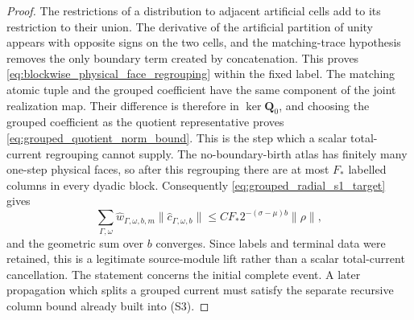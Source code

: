 \documentclass[11pt]{amsart}
\theoremstyle{compactplain}
\theoremstyle{compactdefinition}
\theoremstyle{compactremark}
\begin{document}
\begin{proof}
The restrictions of a distribution to adjacent artificial cells add to its
restriction to their union.  The derivative of the artificial partition of
unity appears with opposite signs on the two cells, and the matching-trace
hypothesis removes the only boundary term created by concatenation.  This
proves \eqref{eq:blockwise_physical_face_regrouping} within the fixed label.
The matching atomic tuple and the grouped coefficient have the same component
of the joint realization map.  Their difference is therefore in
\(\ker\mathbf Q_0\), and choosing the grouped coefficient as the quotient
representative proves \eqref{eq:grouped_quotient_norm_bound}.  This is the
step which a scalar total-current regrouping cannot supply.
The no-boundary-birth atlas has finitely many one-step physical faces, so after
this regrouping there are at most \(F_*\) labelled columns in every dyadic
block.  Consequently \eqref{eq:grouped_radial_s1_target} gives
\[
 \sum_{\Gamma,\omega}
 \widehat w_{\Gamma,\omega,b,m}
 \|\widehat c_{\Gamma,\omega,b}\|
 \le C F_*2^{-(\sigma-\mu)b}\|\rho\|,
\]
and the geometric sum over \(b\) converges.  Since labels and terminal data
were retained, this is a legitimate source-module lift rather than a scalar
total-current cancellation.  The statement concerns the initial complete
event.  A later propagation which splits a grouped current must satisfy the
separate recursive column bound already built into (S3).
\end{proof}
\end{document}
